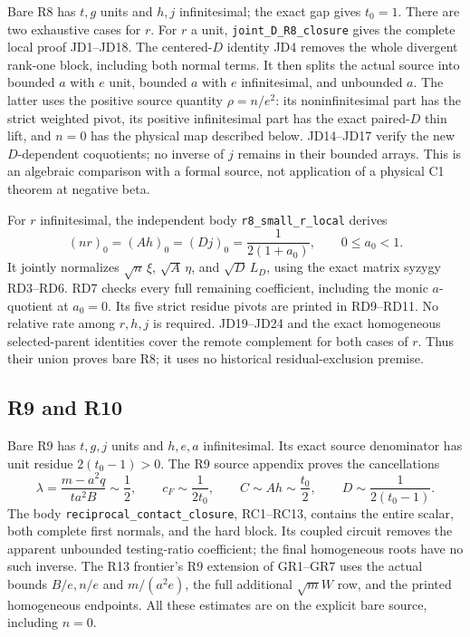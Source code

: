 Bare R8 has \(t,g\) units and \(h,j\) infinitesimal;
the exact gap gives \(t_0=1\).
There are two exhaustive cases for \(r\).
For \(r\) a unit, \texttt{joint\_D\_R8\_closure}
gives the complete local proof JD1--JD18.
The centered-\(D\) identity JD4 removes the whole
divergent rank-one block, including both normal terms.
It then splits the actual source into bounded \(a\)
with \(e\) unit, bounded \(a\) with \(e\) infinitesimal,
and unbounded \(a\).
The latter uses the positive source quantity
\(\rho=n/e^2\): its noninfinitesimal part has the
strict weighted pivot, its positive infinitesimal
part has the exact paired-\(D\) thin lift, and
\(n=0\) has the physical map described below.
JD14--JD17 verify the new \(D\)-dependent coquotients;
no inverse of \(j\) remains in their bounded arrays.
This is an algebraic comparison with a formal source,
not application of a physical C1 theorem at negative beta.

For \(r\) infinitesimal, the independent body
\texttt{r8\_small\_r\_local} derives
\[
 (nr)_0=(Ah)_0=(Dj)_0=\frac1{2(1+a_0)},\qquad
 0\leq a_0<1 .
 \tag{BSR11}
\]
It jointly normalizes \(\sqrt n\,\xi\), \(\sqrt A\,\eta\),
and \(\sqrt D\,L_D\), using the exact matrix syzygy
RD3--RD6.  RD7 checks every full remaining coefficient,
including the monic \(a\)-quotient at \(a_0=0\).
Its five strict residue pivots are printed in RD9--RD11.
No relative rate among \(r,h,j\) is required.
JD19--JD24 and the exact homogeneous selected-parent
identities cover the remote complement for both cases
of \(r\).  Thus their union proves bare R8; it uses no
historical residual-exclusion premise.

\subsection{R9 and R10}

Bare R9 has \(t,g,j\) units and \(h,e,a\)
infinitesimal.  Its exact source denominator has unit
residue \(2(t_0-1)>0\).
The R9 source appendix proves the cancellations
\[
 \lambda=\frac{m-a^2q}{ta^2B}\sim\frac12,\qquad
 c_F\sim\frac1{2t_0},\qquad
 C\sim Ah\sim\frac{t_0}2,\qquad
 D\sim\frac1{2(t_0-1)}.
 \tag{BSR12}
\]
The body \texttt{reciprocal\_contact\_closure},
RC1--RC13, contains the entire scalar, both complete
first normals, and the hard block.  Its coupled circuit
removes the apparent unbounded testing-ratio coefficient;
the final homogeneous roots have no such inverse.
The R13 frontier's R9 extension of GR1--GR7 uses
the actual bounds \(B/e,n/e\) and \(m/(a^2e)\),
the full additional \(\sqrt m W\) row, and the
printed homogeneous endpoints.
All these estimates are on the explicit bare source,
including \(n=0\).

